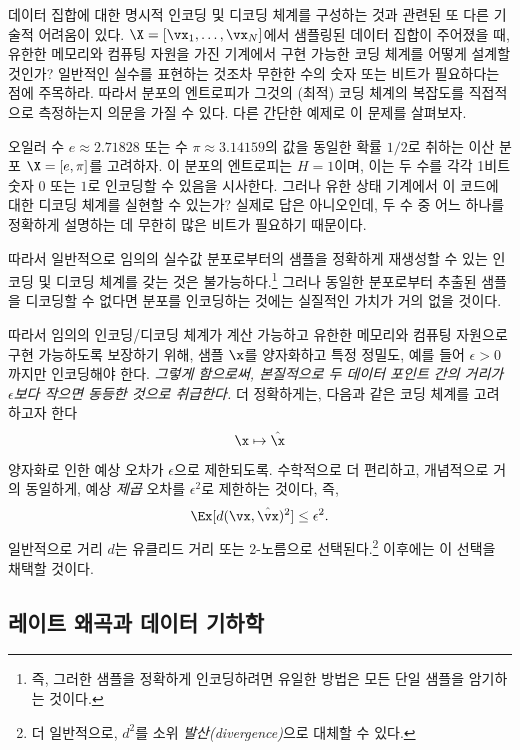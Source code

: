\documentclass[../../book-main_ko.tex]{subfiles}
\begin{document}
데이터 집합에 대한 명시적 인코딩 및 디코딩 체계를 구성하는 것과 관련된 또 다른 기술적 어려움이 있다. $\X = [\vx_1, \ldots, \vx_N]$에서 샘플링된 데이터 집합이 주어졌을 때, 유한한 메모리와 컴퓨팅 자원을 가진 기계에서 구현 가능한 코딩 체계를 어떻게 설계할 것인가? 일반적인 실수를 표현하는 것조차 무한한 수의 숫자 또는 비트가 필요하다는 점에 주목하라. 따라서 분포의 엔트로피가 그것의 (최적) 코딩 체계의 복잡도를 직접적으로 측정하는지 의문을 가질 수 있다. 다른 간단한 예제로 이 문제를 살펴보자.

\begin{example}[정밀도] \label{eg:two-inrational}
	오일러 수 $e \approx 2.71828$ 또는 수 $\pi \approx 3.14159$의 값을 동일한 확률 $1/2$로 취하는 이산 분포 $\X = [e, \pi]$를 고려하자. 이 분포의 엔트로피는 $H =1$이며, 이는 두 수를 각각 1비트 숫자 $0$ 또는 $1$로 인코딩할 수 있음을 시사한다. 그러나 유한 상태 기계에서 이 코드에 대한 디코딩 체계를 실현할 수 있는가? 실제로 답은 아니오인데, 두 수 중 어느 하나를 정확하게 설명하는 데 무한히 많은 비트가 필요하기 때문이다.
\end{example}

따라서 일반적으로 임의의 실수값 분포로부터의 샘플을 정확하게 재생성할 수 있는 인코딩 및 디코딩 체계를 갖는 것은 불가능하다.\footnote{즉, 그러한 샘플을 정확하게 인코딩하려면 유일한 방법은 모든 단일 샘플을 암기하는 것이다.} 그러나 동일한 분포로부터 추출된 샘플을 디코딩할 수 없다면 분포를 인코딩하는 것에는 실질적인 가치가 거의 없을 것이다.

따라서 임의의 인코딩/디코딩 체계가 계산 가능하고 유한한 메모리와 컴퓨팅 자원으로 구현 가능하도록 보장하기 위해, 샘플 $\x$를 양자화하고 특정 정밀도, 예를 들어 $\epsilon > 0$까지만 인코딩해야 한다. {\em 그렇게 함으로써, 본질적으로 두 데이터 포인트 간의 거리가 $\epsilon$보다 작으면 동등한 것으로 취급한다.} 더 정확하게는, 다음과 같은 코딩 체계를 고려하고자 한다
\begin{equation}
	\x \mapsto \hat \x
\end{equation}
양자화로 인한 예상 오차가 $\epsilon$으로 제한되도록. 수학적으로 더 편리하고, 개념적으로 거의 동일하게, 예상 \textit{제곱} 오차를 \(\epsilon^{2}\)로 제한하는 것이다, 즉,
\begin{equation}
	\Ex[d(\vx, \hat \vx)^{2}] \le \epsilon^{2}.
\end{equation}
일반적으로 거리 \(d\)는 유클리드 거리 또는 2-노름으로 선택된다.\footnote{더 일반적으로, \(d^{2}\)를 소위 \textit{발산(divergence)}으로 대체할 수 있다.} 이후에는 이 선택을 채택할 것이다.

\subsection{레이트 왜곡과 데이터 기하학}
\end{document}
